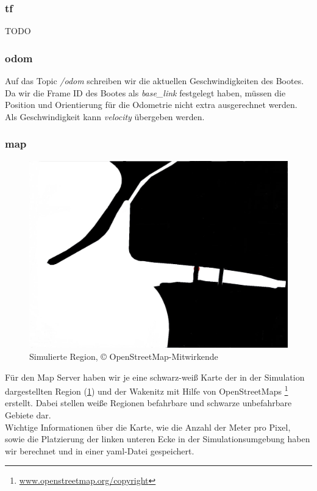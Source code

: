 \documentclass[conference]{IEEEtran}
\begin{document}
\subsubsection{tf}
TODO
\subsubsection{odom}
Auf das Topic \textit{/odom} schreiben wir die aktuellen Geschwindigkeiten des Bootes. Da wir die Frame ID des Bootes als \textit{base\_link} festgelegt haben, müssen die Position und Orientierung für die Odometrie nicht extra ausgerechnet werden. Als Geschwindigkeit kann \textit{velocity} übergeben werden.
\subsubsection{map}
\begin{figure}
	\includegraphics[width=\linewidth]{diluvio.jpg}
	\caption{Simulierte Region, © OpenStreetMap-Mitwirkende}
	\label{diluvio}
\end{figure}
Für den Map Server haben wir je eine schwarz-weiß Karte der in der Simulation dargestellten Region (\ref{diluvio}) und der Wakenitz mit Hilfe von OpenStreetMaps \footnote{\url{www.openstreetmap.org/copyright}} erstellt. Dabei stellen weiße Regionen befahrbare und schwarze unbefahrbare Gebiete dar.\\
Wichtige Informationen über die Karte, wie die Anzahl der Meter pro Pixel, sowie die Platzierung der linken unteren Ecke in der Simulationsumgebung haben wir berechnet und in einer yaml-Datei gespeichert.
\end{document}
